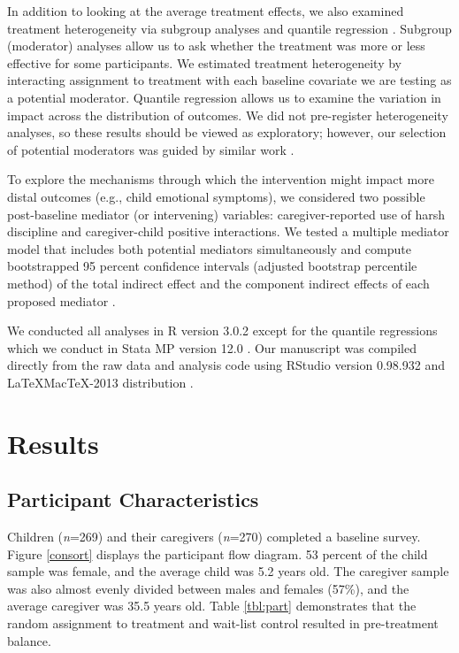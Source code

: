 \documentclass[12pt,authoryear]{elsarticle}\usepackage{knitr}
\begin{document}
In addition to looking at the average treatment effects, we also examined treatment heterogeneity via subgroup analyses \citep{Longford:1999} and quantile regression \citep{Koenker:2005}. Subgroup (moderator) analyses allow us to ask whether the treatment was more or less effective for some participants. We estimated treatment heterogeneity by interacting assignment to treatment with each baseline covariate we are testing as a potential moderator. Quantile regression allows us to examine the variation in impact across the distribution of outcomes. We did not pre-register heterogeneity analyses, so these results should be viewed as exploratory; however, our selection of potential moderators was guided by similar work \citep{Gardner:2010}. 

To explore the mechanisms through which the intervention might impact more distal outcomes (e.g., child emotional symptoms), we considered two possible post-baseline mediator (or intervening) variables: caregiver-reported use of harsh discipline and caregiver-child positive interactions. We tested a multiple mediator model that includes both potential mediators simultaneously and compute bootstrapped 95 percent confidence intervals (adjusted bootstrap percentile method) of the total indirect effect and the component indirect effects of each proposed mediator \citep{Preacher:2008}. 

We conducted all analyses in R version 3.0.2 \citep{RProject} except for the quantile regressions which we conduct in Stata MP version 12.0 \citep{stata12}. Our manuscript was compiled directly from the raw data and analysis code using RStudio version 0.98.932 \citep{RStudio} and \LaTeX MacTeX-2013 distribution \citep{Latex}.

\section*{Results}

\subsection*{Participant Characteristics}

Children (\textit{n}=269) and their caregivers (\textit{n}=270) completed a baseline survey. Figure \ref{consort} displays the participant flow diagram. 53 percent of the child sample was female, and the average child was 5.2 years old. The caregiver sample was also almost evenly divided between males and females (57\%), and the average caregiver was 35.5 years old. Table \ref{tbl:part} demonstrates that the random assignment to treatment and wait-list control resulted in pre-treatment balance. 
\end{document}
